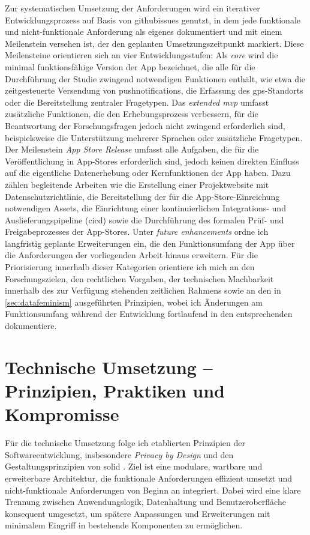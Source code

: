 Zur systematischen Umsetzung der Anforderungen wird ein iterativer Entwicklungsprozess auf Basis von \glspl{githubissue} genutzt, in dem jede funktionale und nicht-funktionale Anforderung als eigenes  dokumentiert und mit einem Meilenstein versehen ist, der den geplanten Umsetzungszeitpunkt markiert. Diese Meilensteine orientieren sich an vier Entwicklungsstufen: Als \textit{core } wird die minimal funktionsfähige Version der App bezeichnet, die alle für die Durchführung der Studie zwingend notwendigen Funktionen enthält, wie etwa die zeitgesteuerte Versendung von \glspl{pushnotification}, die Erfassung des \gls{gps}-Standorts oder die Bereitstellung zentraler Fragetypen. Das \textit{extended \gls{mvp}} umfasst zusätzliche Funktionen, die den Erhebungsprozess verbessern, für die Beantwortung der Forschungsfragen jedoch nicht zwingend erforderlich sind, beispielsweise die Unterstützung mehrerer Sprachen oder zusätzliche Fragetypen. Der Meilenstein \textit{App Store Release} umfasst alle Aufgaben, die für die Veröffentlichung in App-Stores erforderlich sind, jedoch keinen direkten Einfluss auf die eigentliche Datenerhebung oder Kernfunktionen der App haben. Dazu zählen begleitende Arbeiten wie die Erstellung einer Projektwebsite mit Datenschutzrichtlinie, die Bereitstellung der für die App-Store-Einreichung notwendigen Assets, die Einrichtung einer kontinuierlichen Integrations- und Auslieferungspipeline (\gls{cicd}) sowie die Durchführung des formalen Prüf- und Freigabeprozesses der App-Stores. Unter \textit{future enhancements} ordne ich langfristig geplante Erweiterungen ein, die den Funktionsumfang der App über die Anforderungen der vorliegenden Arbeit hinaus erweitern. Für die Priorisierung innerhalb dieser Kategorien orientiere ich mich an den Forschungszielen, den rechtlichen Vorgaben, der technischen Machbarkeit innerhalb des zur Verfügung stehenden zeitlichen Rahmens sowie an den in \cref{sec:datafeminism} ausgeführten Prinzipien, wobei ich Änderungen am Funktionsumfang während der Entwicklung fortlaufend in den entsprechenden  dokumentiere.


\section{Technische Umsetzung -- Prinzipien, Praktiken und Kompromisse}
\label{sec:app_entwicklung_technische_umsetzung}

Für die technische Umsetzung folge ich etablierten Prinzipien der Softwareentwicklung, insbesondere \textit{Privacy by Design} \parencite{cavoukianPrivacyDesign72009} und den Gestaltungsprinzipien von \gls{solid} \parencite{martinCleanArchitectureCraftsmans2018}. Ziel ist eine modulare, wartbare und erweiterbare Architektur, die funktionale Anforderungen effizient umsetzt und nicht-funktionale Anforderungen von Beginn an integriert. Dabei wird eine klare Trennung zwischen Anwendungslogik, Datenhaltung und Benutzeroberfläche konsequent umgesetzt, um spätere Anpassungen und Erweiterungen mit minimalem Eingriff in bestehende Komponenten zu ermöglichen.

